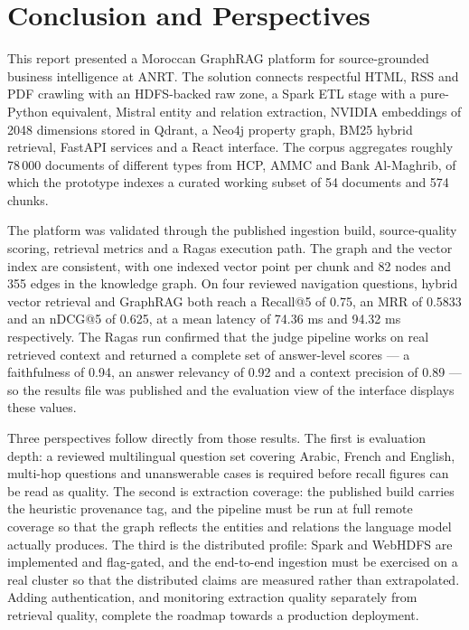 \chapter*{Conclusion and Perspectives}

This report presented a Moroccan GraphRAG platform for source-grounded business intelligence at ANRT. The solution connects respectful HTML, RSS and PDF crawling with an HDFS-backed raw zone, a Spark ETL stage with a pure-Python equivalent, Mistral entity and relation extraction, NVIDIA embeddings of 2048 dimensions stored in Qdrant, a Neo4j property graph, BM25 hybrid retrieval, FastAPI services and a React interface. The corpus aggregates roughly 78\,000 documents of different types from HCP, AMMC and Bank Al-Maghrib, of which the prototype indexes a curated working subset of 54 documents and 574 chunks.

The platform was validated through the published ingestion build, source-quality scoring, retrieval metrics and a Ragas execution path. The graph and the vector index are consistent, with one indexed vector point per chunk and 82 nodes and 355 edges in the knowledge graph. On four reviewed navigation questions, hybrid vector retrieval and GraphRAG both reach a Recall@5 of 0.75, an MRR of 0.5833 and an nDCG@5 of 0.625, at a mean latency of 74.36 ms and 94.32 ms respectively. The Ragas run confirmed that the judge pipeline works on real retrieved context and returned a complete set of answer-level scores --- a faithfulness of 0.94, an answer relevancy of 0.92 and a context precision of 0.89 --- so the results file was published and the evaluation view of the interface displays these values.

Three perspectives follow directly from those results. The first is evaluation depth: a reviewed multilingual question set covering Arabic, French and English, multi-hop questions and unanswerable cases is required before recall figures can be read as quality. The second is extraction coverage: the published build carries the heuristic provenance tag, and the pipeline must be run at full remote coverage so that the graph reflects the entities and relations the language model actually produces. The third is the distributed profile: Spark and WebHDFS are implemented and flag-gated, and the end-to-end ingestion must be exercised on a real cluster so that the distributed claims are measured rather than extrapolated. Adding authentication, and monitoring extraction quality separately from retrieval quality, complete the roadmap towards a production deployment.

